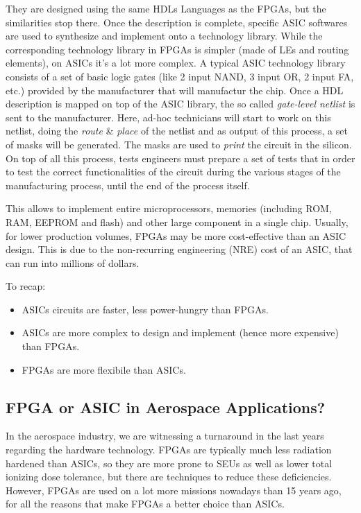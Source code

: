 They are designed using the same HDLs Languages as the FPGAs, but the similarities stop there. Once the description is complete, specific ASIC softwares are used to synthesize and implement onto a technology library. While the corresponding technology library in FPGAs is simpler (made of LEs and routing elements), on ASICs it's a lot more complex. A typical ASIC technology library consists of a set of basic logic gates (like 2 input NAND, 3 input OR, 2 input FA, etc.) provided by the manufacturer that will manufactur the chip. Once a HDL description is mapped on top of the ASIC library, the so called \textit{gate-level netlist} is sent to the manufacturer. Here, ad-hoc technicians will start to work on this netlist, doing the \textit{route} {\&} \textit{place} of the netlist and as output of this process, a set of masks will be generated. The masks are used to \textit{print} the circuit in the silicon. On top of all this process, tests engineers must prepare a set of tests that in order to test the correct functionalities of the circuit during the various stages of the manufacturing process, until the end of the process itself. \bigskip

This allows to implement entire microprocessors, memories (including ROM, RAM, EEPROM and flash) and other large component in a single chip. Usually, for lower production volumes, FPGAs may be more cost-effective than an ASIC design. This is due to the non-recurring engineering (NRE) cost of an ASIC, that can run into millions of dollars. \bigskip

To recap:
\begin{itemize}
    \item ASICs circuits are faster, less power-hungry than FPGAs.
    \item ASICs are more complex to design and implement (hence more expensive) than FPGAs.
    \item FPGAs are more flexibile than ASICs.
\end{itemize}


\subsection{FPGA or ASIC in Aerospace Applications?}

In the aerospace industry, we are witnessing a turnaround in the last years regarding the hardware technology. FPGAs are typically much less radiation hardened than ASICs, so they are more prone to SEUs as well as lower total ionizing dose tolerance, but there are techniques to reduce these deficiencies. However, FPGAs are used on a lot more missions nowadays than 15 years ago, for all the reasons that make FPGAs a better choice than ASICs.\bigskip

